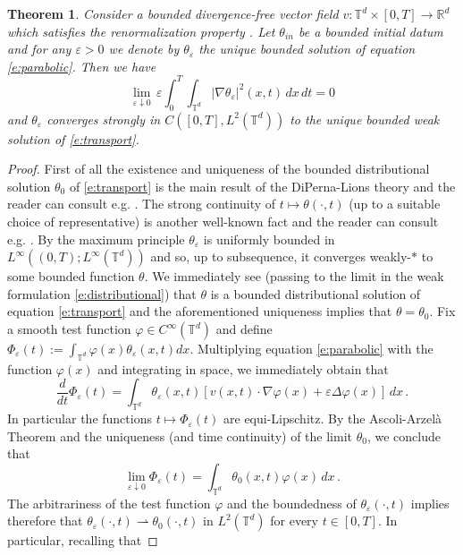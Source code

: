 \documentclass[11pt,reqno]{amsart}
\newtheorem{theorem}{Theorem}[section]
\theoremstyle{definition}
\numberwithin{equation}{section}
\begin{document}
\begin{theorem}\label{p:no-dissipation}
Consider a bounded divergence-free vector field $v: \mathbb T^d \times [0,T] \to \mathbb R^d$ which satisfies the renormalization property . Let $\theta_{in}$ be a bounded initial datum and for any $\varepsilon>0$ we denote by $\theta_\varepsilon$ the unique bounded solution of equation \eqref{e:parabolic}. Then we have
\begin{equation}\label{e:no-dissipation}
\lim_{\varepsilon \downarrow 0}\, \varepsilon \int_0^T \int_{\mathbb T^d} |\nabla \theta_\varepsilon|^2 (x,t)\, dx\, dt = 0
\end{equation}
and $\theta_\varepsilon$ converges strongly in $C([0,T], L^2 (\mathbb{T}^d))$ to the unique bounded weak solution of \eqref{e:transport}.
\end{theorem}
\begin{proof}
First of all the existence and uniqueness of the bounded distributional solution $\theta_0$ of \eqref{e:transport} is the main result of the DiPerna-Lions theory and the reader can consult e.g. \cite[Theorem 3.3 \& Proposition 3.6]{delellis}. The strong continuity of $t\mapsto \theta (\cdot, t)$ (up to a suitable choice of representative) is another well-known fact and the reader can consult e.g. \cite[Remark 25]{ambrosio}. By the maximum principle $\theta_\varepsilon$ is uniformly bounded in $L^\infty ((0,T); L^\infty (\mathbb{T}^d))$ and so, up to subsequence, it converges weakly-$*$ to some bounded function $\theta$. We immediately see (passing to the limit in the weak formulation \eqref{e:distributional}) that $\theta$ is a bounded distributional solution of equation \eqref{e:transport} and the aforementioned uniqueness implies that $\theta = \theta_0$. Fix a smooth test function $\varphi\in C^\infty (\mathbb T^d)$ and define $\Phi_\varepsilon (t) := \int_{\mathbb{T}^d} \varphi (x) \theta_\varepsilon (x,t) dx$. Multiplying equation \eqref{e:parabolic} with the function $\varphi (x)$ and integrating in space, we immediately obtain that 
\[
\frac{d}{dt} \Phi_\varepsilon (t) = \int_{\mathbb{T}^d} \theta_\varepsilon (x,t) \left[v (x,t) \cdot \nabla \varphi (x) + \varepsilon \Delta \varphi (x)\right]\, dx\, .
\]
In particular the functions $t\mapsto \Phi_\varepsilon (t)$ are equi-Lipschitz. By the Ascoli-Arzel\`a Theorem and the uniqueness (and time continuity) of the limit $\theta_0$, we conclude that 
\[
\lim_{\varepsilon \downarrow 0} \Phi_\varepsilon (t) = \int_{\mathbb{T}^d} \theta_0 (x,t) \varphi (x)\, dx\, .
\]
The arbitrariness of the test function $\varphi$ and the boundedness of $\theta_\varepsilon (\cdot, t)$ implies therefore that $\theta_\varepsilon (\cdot, t) \rightharpoonup \theta_0 (\cdot, t)$ in $L^2 (\mathbb T^d)$ for every $t \in [0,T]$. In particular, recalling that 

\end{proof}
\end{document}
